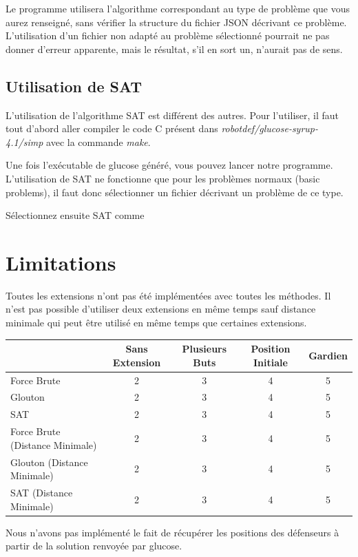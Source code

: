 Le programme utilisera l'algorithme correspondant au type de problème que vous aurez renseigné, sans vérifier la structure du fichier JSON décrivant ce problème. L'utilisation d'un fichier non adapté au problème sélectionné pourrait ne pas donner d'erreur apparente, mais le résultat, s'il en sort un, n'aurait pas de sens.

\subsection{Utilisation de SAT}

L'utilisation de l'algorithme SAT est différent des autres. Pour l'utiliser, il faut tout d'abord aller compiler le code C présent dans \textit{robotdef/glucose-syrup-4.1/simp} avec la commande \textit{make}.

Une fois l'exécutable de glucose généré, vous pouvez lancer notre programme. L'utilisation de SAT ne fonctionne que pour les problèmes normaux (basic problems), il faut donc sélectionner un fichier décrivant un problème de ce type. 

Sélectionnez ensuite SAT comme 


\section{Limitations}

Toutes les extensions n'ont pas été implémentées avec toutes les méthodes. Il n'est pas possible d'utiliser deux extensions en même temps sauf distance minimale qui peut être utilisé en même temps que certaines extensions.

\begin{tabular}{| l | c | c | c | c |}
 \hline		
     & Sans Extension & Plusieurs Buts & Position Initiale & Gardien \\
   \hline 
   Force Brute & 2 & 3 & 4 & 5\\
  \hline  
 Glouton & 2 & 3 & 4  & 5\\
 \hline  
 SAT & 2 & 3 & 4  & 5\\
 \hline  
 Force Brute (Distance Minimale) & 2 & 3 & 4  & 5\\
 \hline  
 Glouton (Distance Minimale) & 2 & 3 & 4  & 5\\
 \hline 
 SAT (Distance Minimale) & 2 & 3 & 4  & 5\\
  \hline  
 \end{tabular}

Nous n'avons pas implémenté le fait de récupérer les positions des défenseurs à partir de la solution renvoyée par glucose. 

